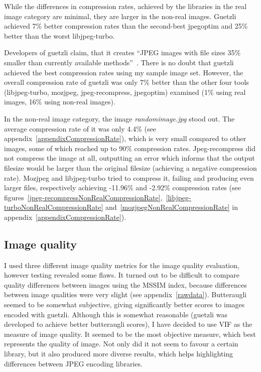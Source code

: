 \documentclass[12pt]{article}
\begin{document}
While the differences in compression rates, achieved by the libraries in the real image category are minimal, they are larger in the non-real images. Guetzli achieved 7\% better compression rates than the second-best jpegoptim and 25\% better than the worst libjpeg-turbo.

Developers of guetzli claim, that it creates ``JPEG images with file sizes 35\% smaller than currently available methods''~\cite{guetzli}. There is no doubt that guetzli achieved the best compression rates using my sample image set. However, the overall compression rate of guetzli was only 7\% better than the other four tools (libjpeg-turbo, mozjpeg, jpeg-recompress, jpegoptim) examined (1\% using real images, 16\% using non-real images).

In the non-real image category, the image \textit{randomimage.jpg} stood out. The average compression rate of it was only 4.4\% (see appendix~\ref{appendixCompressionRate}), which is very small compared to other images, some of which reached up to 90\% compression rates. Jpeg-recompress did not compress the image at all, outputting an error which informs that the output filesize would be larger than the original filesize (achieving a negative compression rate). Mozjpeg and libjpeg-turbo tried to compress it, failing and producing even larger files, respectively achieving -11.96\% and -2.92\% compression rates (see figures~\ref{jpeg-recompressNonRealCompressionRate},~\ref{libjpeg-turboNonRealCompressionRate} and~\ref{mozjpegNonRealCompressionRate} in appendix~\ref{appendixCompressionRate}).
\subsection{Image quality}
I used three different image quality metrics for the image quality evaluation, however testing revealed some flaws. It turned out to be difficult to compare quality differences between images using the MSSIM index, because differences between image qualities were very slight (see appendix~\ref{rawdata}). Butteraugli seemed to be somewhat subjective, giving significantly better scores to images encoded with guetzli. Although this is somewhat reasonable (guetzli was developed to achieve better butteraugli scores), I have decided to use VIF as the measure of image quality. It seemed to be the most objective measure, which best represents the quality of image. Not only did it not seem to favour a certain library, but it also produced more diverse results, which helps highlighting differences between JPEG encoding libraries.
\end{document}
